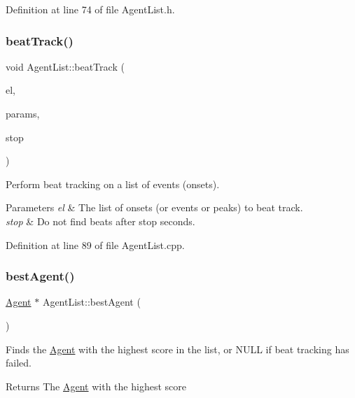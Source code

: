 Definition at line 74 of file Agent\+List.\+h.

\mbox{\label{class_agent_list_a74c40095f26a193e815ae2c7e8f8269d}} 
\subsubsection{\texorpdfstring{beat\+Track()}{beatTrack()}\hspace{0.1cm}{\footnotesize\ttfamily [2/2]}}
{\footnotesize\ttfamily void Agent\+List\+::beat\+Track (\begin{DoxyParamCaption}\item[{const Event\+List \&}]{el,  }\item[{const \hyperlink{class_agent_parameters}{Agent\+Parameters} \&}]{params,  }\item[{double}]{stop }\end{DoxyParamCaption})}

Perform beat tracking on a list of events (onsets). 
\begin{DoxyParams}{Parameters}
{\em el} & The list of onsets (or events or peaks) to beat track. \\
\hline
{\em stop} & Do not find beats after {\ttfamily stop} seconds. \\
\hline
\end{DoxyParams}


Definition at line 89 of file Agent\+List.\+cpp.

\mbox{\label{class_agent_list_af9d27edccc5f7915d4d3f554778e108c}} 
\subsubsection{\texorpdfstring{best\+Agent()}{bestAgent()}}
{\footnotesize\ttfamily \hyperlink{class_agent}{Agent} $\ast$ Agent\+List\+::best\+Agent (\begin{DoxyParamCaption}{ }\end{DoxyParamCaption})}

Finds the \hyperlink{class_agent}{Agent} with the highest score in the list, or N\+U\+LL if beat tracking has failed. \begin{DoxyReturn}{Returns}
The \hyperlink{class_agent}{Agent} with the highest score 
\end{DoxyReturn}


